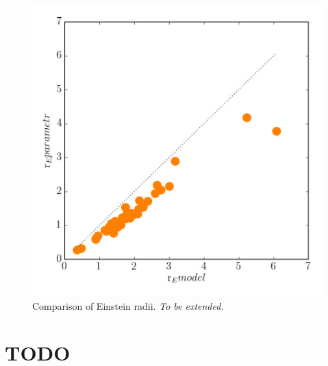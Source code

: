 \documentclass[fleqn,usenatbib]{mnras}
\begin{document}
\begin{figure}
  \includegraphics[width=\linewidth]{img/rE_comp/rE_comp.png}
  \caption{Comparison of Einstein radii. {\em To be extended.}}
  \label{fig:parameter}
\end{figure}


\section{TODO}
\listoftodos

\bsp	%
\label{lastpage}
\end{document}
